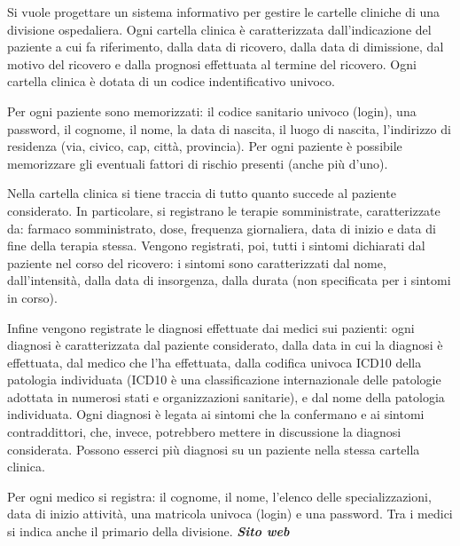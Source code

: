 \documentclass[a4paper,titlepage]{article}
\begin{document}
\noindent
Si vuole progettare un sistema informativo per gestire le cartelle cliniche di una divisione ospedaliera. Ogni cartella clinica è caratterizzata dall'indicazione del paziente a cui fa riferimento, dalla data di ricovero, dalla data di dimissione, dal motivo del ricovero e dalla prognosi effettuata al termine del ricovero. Ogni cartella clinica è dotata di un codice indentificativo univoco.\par
\noindent
Per ogni paziente sono memorizzati: il codice sanitario univoco (login), una password, il cognome, il nome, la data di nascita, il luogo di nascita, l'indirizzo di residenza (via, civico, cap, città, provincia). Per ogni paziente è possibile memorizzare gli eventuali fattori di rischio presenti (anche più d'uno).\par
\noindent
Nella cartella clinica si tiene traccia di tutto quanto succede al paziente considerato. In particolare, si registrano le terapie somministrate, caratterizzate da: farmaco somministrato, dose, frequenza giornaliera, data di inizio e data di fine della terapia stessa. Vengono registrati, poi, tutti i sintomi dichiarati dal paziente nel corso del ricovero: i sintomi sono caratterizzati dal nome, dall'intensità, dalla data di insorgenza, dalla durata (non specificata per i sintomi in corso).\par
\noindent
Infine vengono registrate le diagnosi effettuate dai medici sui pazienti: ogni diagnosi è caratterizzata dal paziente considerato, dalla data in cui la diagnosi è effettuata, dal medico che l'ha effettuata, dalla codifica univoca ICD10 della patologia individuata (ICD10 è una classificazione internazionale delle patologie adottata in numerosi stati e organizzazioni sanitarie), e dal nome della patologia individuata. Ogni diagnosi è legata ai sintomi che la confermano e ai sintomi contraddittori, che, invece, potrebbero mettere in discussione la diagnosi considerata. Possono esserci più diagnosi su un paziente nella stessa cartella clinica.\par
\noindent
Per ogni medico si registra: il cognome, il nome, l'elenco delle specializzazioni, data di inizio attività, una matricola univoca (login) e una password. Tra i medici si indica anche il primario della divisione.\newline
\newline
\emph{\textbf{\large{Sito web}}}
\end{document}

